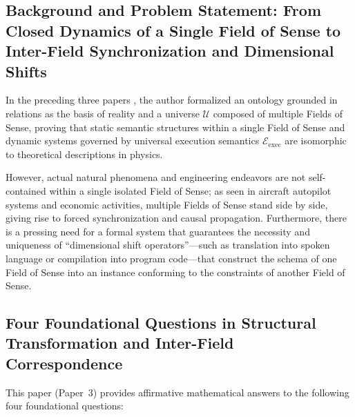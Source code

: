 \documentclass[11pt,a4paper]{article}
\theoremstyle{definition}
\theoremstyle{plain}
\theoremstyle{remark}
\newcommand{\Eexec}{\mathcal{E}_{\mathrm{exec}}}
\begin{document}
\subsection{Background and Problem Statement: From Closed Dynamics of a Single Field of Sense to Inter-Field Synchronization and Dimensional Shifts}
In the preceding three papers \cite{ota2026paper0,ota2026paper1,ota2026paper2}, the author formalized an ontology grounded in relations as the basis of reality and a universe $\mathcal{U}$ composed of multiple Fields of Sense, proving that static semantic structures within a single Field of Sense and dynamic systems governed by universal execution semantics $\Eexec$ are isomorphic to theoretical descriptions in physics.

However, actual natural phenomena and engineering endeavors are not self-contained within a single isolated Field of Sense; as seen in aircraft autopilot systems and economic activities, multiple Fields of Sense stand side by side, giving rise to forced synchronization and causal propagation. Furthermore, there is a pressing need for a formal system that guarantees the necessity and uniqueness of ``dimensional shift operators''---such as translation into spoken language or compilation into program code---that construct the schema of one Field of Sense into an instance conforming to the constraints of another Field of Sense.

\subsection{Four Foundational Questions in Structural Transformation and Inter-Field Correspondence}
This paper (Paper~3) provides affirmative mathematical answers to the following four foundational questions:
\end{document}
